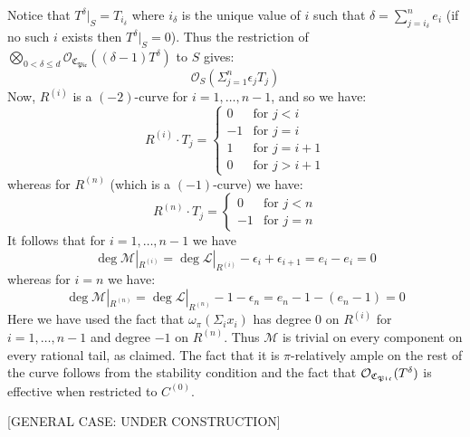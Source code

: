 Notice that $T^\delta|_S = T_{i_\delta}$ where $i_\delta$ is the unique value of $i$ such that $\delta = \sum_{j=i_{\delta}}^n e_i$ (if no such $i$ exists then $T^\delta|_S = 0$). Thus the restriction of $\bigotimes_{0<\delta\leq d}\mathcal{O}_{\mathfrak{C}_{\mathfrak{Pic}}}((\delta-1) T^\delta)$ to $S$ gives:
\begin{equation*} \mathcal{O}_S(\Sigma_{j=1}^n \epsilon_j T_j) \end{equation*}
Now, $R^{(i)}$ is a $(-2)$-curve for $i=1,\ldots,n-1$, and so we have:
\begin{equation*}
R^{(i)}\cdot T_j =
  \begin{cases}
    0 & \text{for } j<i \\
    -1 & \text{for } j=i \\
    1 & \text{for } j=i+1 \\
    0 & \text{for } j>i+1
  \end{cases}
\end{equation*}
whereas for $R^{(n)}$ (which is a $(-1)$-curve) we have:
\begin{equation*}
R^{(n)} \cdot T_j =
\begin{cases}
0 & \text{for } j < n \\
-1 & \text{for } j = n
\end{cases}
\end{equation*}
It follows that for $i=1,\ldots,n-1$ we have
\begin{equation*} \deg \mathcal{M}|_{R^{(i)}} = \deg \mathcal{L}|_{R^{(i)}} - \epsilon_i + \epsilon_{i+1} = e_i - e_i = 0 \end{equation*}
whereas for $i=n$ we have:
\begin{equation*} \deg \mathcal{M}|_{R^{(n)}} = \deg \mathcal{L}|_{R^{(n)}} - 1 - \epsilon_n = e_n - 1 - (e_n-1) = 0\end{equation*}
Here we have used the fact that $\omega_\pi(\Sigma_i x_i)$ has degree $0$ on $R^{(i)}$ for $i=1,\ldots,n-1$ and degree $-1$ on $R^{(n)}$. Thus $\mathcal{M}$ is trivial on every component on every rational tail, as claimed. The fact that it is $\pi$-relatively ample on the rest of the curve follows from the stability condition and the fact that $\mathcal{O}_{\mathfrak{C}_{\mathfrak{Pic}}}(T^\delta)$ is effective when restricted to $C^{(0)}$.

[GENERAL CASE: UNDER CONSTRUCTION]

